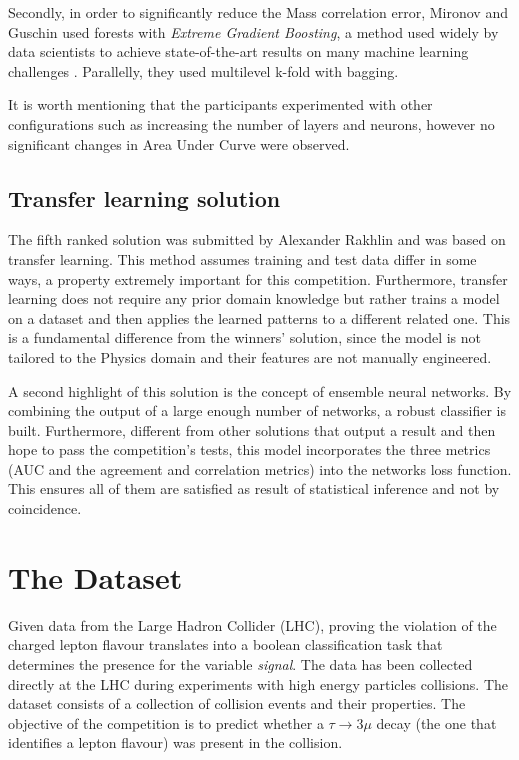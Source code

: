 \documentclass[conference]{IEEEtran}
\begin{document}
Secondly, in order to significantly reduce the Mass correlation error, Mironov and Guschin used forests with \textit{Extreme Gradient Boosting}, a method used widely by data scientists to achieve state-of-the-art results on many machine learning challenges \cite{chen2016xgboost}. Parallelly, they used multilevel k-fold with bagging.

It is worth mentioning that the participants experimented with other configurations such as increasing the number of layers and neurons, however no significant changes in Area Under Curve were observed.

\subsection{Transfer learning solution}
The fifth ranked solution was submitted by Alexander Rakhlin and was based on transfer learning. This method assumes training and test data differ in some ways, a property extremely important for this competition. Furthermore, transfer learning does not require any prior domain knowledge but rather trains a model on a dataset and then applies the learned patterns to a different related one. This is a fundamental difference from the winners' solution, since the model is not tailored to the Physics domain and their features are not manually engineered.

A second highlight of this solution is the concept of ensemble neural networks. By combining the output of a large enough number of networks, a robust classifier is built. Furthermore, different from other solutions that output a result and then hope to pass the competition's tests, this model incorporates the three metrics (AUC and the agreement and correlation metrics) into the networks loss function. This ensures all of them are satisfied as result of statistical inference and not by coincidence.

\section{The Dataset}
\label{sec:dataset}
Given data from the Large Hadron Collider (LHC), proving the violation of the charged lepton flavour translates into a boolean classification task that determines the presence for the variable \textit{signal}.  The data has been collected directly at the
LHC during experiments with high energy particles collisions. The dataset consists of a collection of collision events and their properties. The objective of the competition is to predict whether a $\tau \rightarrow 3\mu$ decay (the one that identifies a lepton flavour) was present in the collision. 
\end{document}
